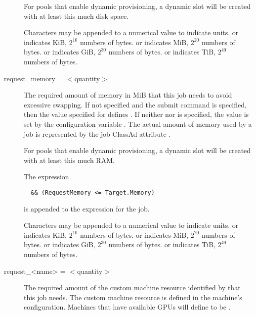 \begin{description}
For pools that enable
dynamic  provisioning,
a dynamic slot will be created with at least this much disk space.

Characters may be appended to a numerical value to indicate units. 
 or  indicates KiB, $2^{10}$ numbers of bytes.
 or  indicates MiB, $2^{20}$ numbers of bytes.
 or  indicates GiB, $2^{30}$ numbers of bytes.
 or  indicates TiB, $2^{40}$ numbers of bytes.


\label{man-condor-submit-request-memory}
\item[request\_memory = $<$quantity$>$] 
The required amount of memory in MiB that this job needs
to avoid excessive swapping.
If not specified and the submit command  is specified, 
then the value specified
for  defines .
If neither  nor  is specified,
the value is set by the configuration variable
.
The actual amount of memory used by a job is represented by the
job ClassAd attribute .

For pools that enable
dynamic  provisioning,
a dynamic slot will be created with at least this much RAM.

The expression
\begin{verbatim}
  && (RequestMemory <= Target.Memory) 
\end{verbatim}
is appended to the  expression for the job.

Characters may be appended to a numerical value to indicate units. 
 or  indicates KiB, $2^{10}$ numbers of bytes.
 or  indicates MiB, $2^{20}$ numbers of bytes.
 or  indicates GiB, $2^{30}$ numbers of bytes.
 or  indicates TiB, $2^{40}$ numbers of bytes.


\label{man-condor-submit-request-name}
\item[request\_<name> = $<$quantity$>$] 
The required amount of the custom machine resource 
identified by  that this job needs.
The custom machine resource is defined in the machine's configuration.
Machines that have available GPUs will define 
to be .


\end{description}
